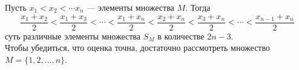 \documentclass{article}
\begin{document}
Пусть $x_1 < x_2 < \cdots x_n$ --- элементы множества $M$. Тогда
$$\frac{x_1+x_2}{2} < \frac{x_1+x_3}{2} < \cdots < \frac{x_1+x_n}{2} < \frac{x_2+x_n}{2} < \frac{x_3+x_n}{2} < \cdots < \frac{x_{n-1}+x_n}{2}$$
суть различные элементы множества $S_M$ в количестве $2n-3$.\\
Чтобы убедиться, что оценка точна, достаточно рассмотреть множество $M=\{1,2,\ldots,n\}$.
\end{document}
